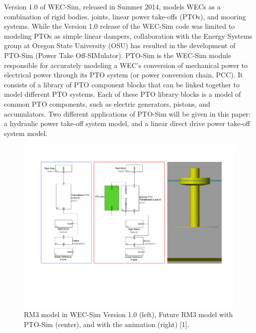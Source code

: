 \documentclass[twocolumn,10pt]{asme2e}
\begin{document}
Version 1.0 of WEC-Sim, released in Summer 2014, models WECs as a combination of rigid bodies, joints, linear power take-offs (PTOs), and mooring systems. While the Version 1.0 release of the WEC-Sim code was limited to modeling PTOs as simple linear dampers, collaboration with the Energy Systems group at Oregon State University (OSU) has resulted in the development of PTO-Sim (Power Take Off-SIMulator). PTO-Sim is the WEC-Sim module responsible for accurately modeling a WEC's conversion of mechanical power to electrical power through its PTO system (or power conversion chain, PCC). It consists of a library of PTO component blocks that can be linked together to model different PTO systems. Each of these PTO library blocks is a model of common PTO components, such as electric generators, pistons, and accumulators. Two different applications of PTO-Sim will be given in this paper: a hydraulic power take-off system model, and  a linear direct drive power take-off system model. 



\begin{figure}[t]
    \centering
    \includegraphics[width=1\columnwidth]{Images/RM3_update}
    \caption{RM3 model in WEC-Sim Version 1.0 (left), Future RM3 model with PTO-Sim (center), and with the animation (right) [1].}
    \label{RM3}
    \end{figure}
\end{document}
